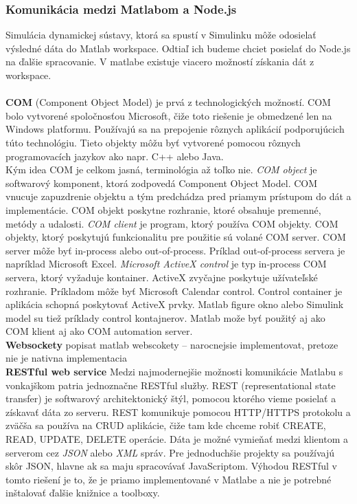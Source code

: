 \subsubsection{Komunikácia medzi Matlabom a Node.js}
Simulácia dynamickej sústavy, ktorá sa spustí v Simulinku môže odosielať výsledné dáta do Matlab workspace. Odtiaľ ich budeme chciet posielať do Node.js na ďalšie spracovanie. V matlabe existuje viacero možností získania dát z workspace.\\\\
\textbf{COM} (Component Object Model) je prvá z technologických možností. COM bolo vytvorené spoločnosťou Microsoft, čiže toto riešenie je obmedzené len na Windows platformu. Používajú sa na prepojenie rôznych aplikácií podporujúcich túto technológiu. Tieto objekty môžu byť vytvorené pomocou rôznych programovacích jazykov ako napr. C++ alebo Java.\cite{matlab-microsoft-com}\\
Kým idea COM je celkom jasná, terminológia až toľko nie. \textit{COM object} je softwarový komponent, ktorá zodpovedá Component Object Model. COM vnucuje zapuzdrenie objektu a tým predchádza pred priamym prístupom do dát a implementácie. COM objekt poskytne rozhranie, ktoré obsahuje premenné, metódy a udalosti. \textit{COM client} je program, ktorý používa COM objekty. COM objekty, ktorý poskytujú funkcionalitu pre použitie sú volané COM server. COM server môže byť in-process alebo out-of-process. Príklad out-of-process servera je napríklad Microsoft Excel. \textit{Microsoft ActiveX control} je typ in-process COM servera, ktorý vyžaduje kontainer. ActiveX zvyčajne poskytuje užívateľské rozhranie. Príkladom môže byť Microsoft Calendar control. Control container je aplikácia schopná poskytovať ActiveX prvky. Matlab figure okno alebo Simulink model su tiež príklady control kontajnerov. Matlab može byť použitý aj ako COM klient aj ako COM automation server.\cite{matlab-com}\\

\textbf{Websockety}
popisat matlab webscokety -- narocnejsie implementovat, pretoze nie je nativna implementacia\\
%
% 

\textbf{RESTful web service}
Medzi najmodernejšie možnosti komunikácie Matlabu s vonkajškom patria jednoznačne RESTful služby. REST (representational state transfer) je softwarový architektonický štýl, pomocou ktorého vieme posielať a získavať dáta zo serveru. REST komunikuje pomocou HTTP/HTTPS protokolu a zväčša sa používa na CRUD aplikácie, čiže tam kde chceme robiť CREATE, READ, UPDATE, DELETE operácie. Dáta je možné vymieňať medzi klientom a serverom cez \textit{JSON} alebo \textit{XML} správ. Pre jednoduchšie projekty sa používajú skôr JSON, hlavne ak sa maju spracovávať JavaScriptom. Výhodou RESTful v tomto riešení je to, že je priamo implementované v Matlabe a nie je potrebné inštalovať ďalšie knižnice a toolboxy.

